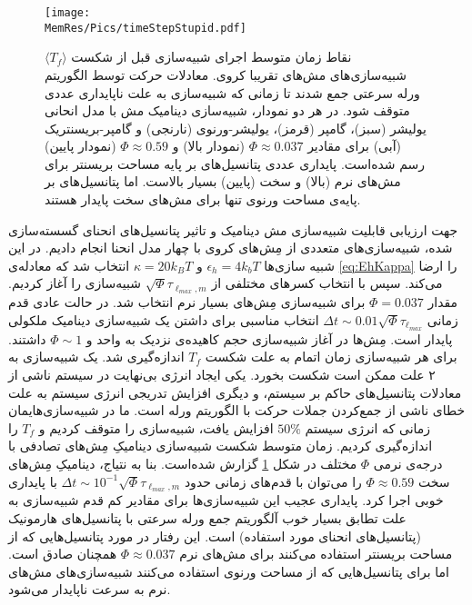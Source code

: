 \begin{figure}[tbp]
\begin{center}
\texttt{[image: \\MemRes/Pics/timeStepStupid.pdf]}
\caption{
نقاط زمان متوسط اجرای شبیه‌سازی قبل از شکست
$\langle T_f\rangle$
شبیه‌سازی‌های مش‌های تقریبا کروی. معادلات حرکت توسط الگوریتم ورله سرعتی جمع شدند تا زمانی که شبیه‌سازی به علت ناپایداری عددی متوقف شود. در هر دو نمودار، شبیه‌سازی دینامیک مش با مدل انحانی یولیشر (سبز)، گامپر (قرمز)، یولیشر-ورنوی (نارنجی) و گامپر-بریسنتریک (آبی) برای مقادیر 
$\Phi\approx0.037$ 
(نمودار بالا) و
$\Phi\approx0.59$ 
(نمودار پایین) رسم شده‌است. پایداری عددی پتانسیل‌های بر پایه مساحت بریسنتر برای مش‌های نرم (بالا) و سخت (پایین) بسیار بالاست. اما پتانسیل‌های بر پایه‌ی مساحت ورنوی تنها برای مش‌های سخت پایدار هستند.
}
\label{fig:timeSteps}
\end{center}
\end{figure}


جهت ارزیابی قابلیت شبیه‌سازی مش دینامیک و تاثیر پتانسیل‌های انحنای گسسته‌سازی شده، شبیه‌سازی‌های متعددی از مِش‌های کروی با چهار مدل انحنا انجام دادیم. در این شبیه سازی‌ها
$\epsilon_h=4k_bT$
و
$\kappa=20k_BT$
انتخاب شد که معادله‌ی
\ref{eq:EhKappa}
را ارضا می‌کند. سپس با انتخاب کسر‌های مختلفی از
 $\sqrt{\Phi}\tau_{\ell_{max},m}$
شبیه‌سازی را آغاز کردیم. مقدار
$\Phi=0.037$
برای شبیه‌سازی مِش‌های بسیار نرم انتخاب شد. در حالت عادی قدم زمانی
$\Delta t\sim0.01\sqrt{\Phi}\tau_{\ell_{max}}$
انتخاب مناسبی برای داشتن یک شبیه‌سازی دینامیک ملکولی پایدار است. مِش‌ها در آغاز شبیه‌سازی حجم کاهیده‌ی نزدیک به واحد و 
$\Phi\sim1$
داشتند. برای هر شبیه‌سازی زمان اتمام به علت شکست 
$T_f$
اندازه‌گیری شد. یک شبیه‌سازی به ۲ علت ممکن است شکست بخورد. یکی ایجاد انرژی بی‌نهایت در سیستم ناشی از معادلات پتانسیل‌های حاکم بر سیستم، و دیگری افزایش تدریجی انرژی سیستم به علت خطای ناشی از جمع‌کردن جملات حرکت با الگوریتم ورله است. ما در شبیه‌سازی‌هایمان زمانی که انرژی سیستم 
$50\%$
افزایش یافت، شبیه‌سازی را متوقف کردیم و 
$T_f$
را اندازه‌گیری کردیم. زمان متوسط شکست شبیه‌سازی دینامیکِ مِش‌های تصادفی با درجه‌ی نرمی 
$\Phi$
مختلف در شکل
\ref{fig:timeSteps}
گزارش شده‌است. بنا به نتیاج، دینامیکِ مِش‌های سخت 
$\Phi\approx 0.59$
را می‌توان با قدم‌های زمانی حدود
$\Delta t \sim10^{-1}\sqrt{\Phi}\tau_{\ell_{max},m}$
با پایداری خوبی اجرا کرد. پایداری عجیب این شبیه‌سازی‌ها برای مقادیر کم قدم شبیه‌سازی به علت تطابق بسیار خوب آلگوریتم جمع ورله سرعتی با پتانسیل‌های هارمونیک (پتانسیل‌های انحنای مورد استفاده) است. این رفتار در مورد پتانسیل‌هایی که از مساحت بریسنتر استفاده می‌کنند برای مش‌های نرم
$\Phi\approx 0.037$
همچنان صادق است. اما برای پتانسیل‌هایی که از مساحت ورنوی استفاده می‌کنند شبیه‌سازی‌های مش‌های نرم به سرعت ناپایدار می‌شود. 

